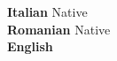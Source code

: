\documentclass[9pt, green]{template/developercv} %
\begin{document}
{\begin{minipage}[t]{0.28\textwidth}
	\vspace{1.2mm}
	\small \textbf{Italian} \hfill {\ssmall Native \hspace{3pt}} \\
	
	\vspace{1.2mm}
	\small \textbf{Romanian} \hfill {\ssmall Native \hspace{3pt}} \\
	
	\vspace{1.2mm}
	\small \textbf{English} \hfill {} \\
	
\end{minipage}

\vspace{-4mm}

}
\end{document}
